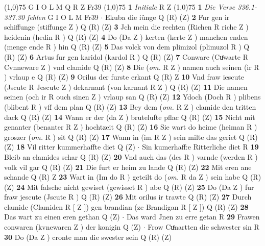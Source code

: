 \documentclass[8pt,a4paper,notitlepage]{article}
\begin{document}
\begin{table}[ht]
\begin{minipage}[t]{0.5\linewidth}
\line(1,0){75} \newline
G I O L M Q R Z Fr39 \newline
\line(1,0){75} \newline
\textbf{1} \textit{Initiale} R Z  \newline
\line(1,0){75} \newline
\textbf{1} \textit{Die Verse 336.1-337.30 fehlen} G I O L M Fr39   $\cdot$ Ekuba die iûnge Q (R) (Z) \textbf{2} Fur gen ir schiffunge (stiffunge Z ) Q (R) (Z) \textbf{3} Jch mein die rechten (Richen R riche Z ) heidenin (hedin R ) Q (R) (Z) \textbf{4} Do (Da Z ) kerten (kerte Z ) manchen enden (menge ende R ) hin Q (R) (Z) \textbf{5} Das volck von dem plimizol (plimuzol R ) Q (R) (Z) \textbf{6} Artus fur gen karidol (kardol R ) Q (R) (Z) \textbf{7} Conware (Cuͦwarte R Cvnneware Z ) vnd clamide Q (R) (Z) \textbf{8} Die (\textit{om.} R Z ) namen auch seinen (ir R ) vrlaup e Q (R) (Z) \textbf{9} Orilus der furste erkant Q (R) Z \textbf{10} Vnd fraw iescute (Jscute R Jescute Z ) dekarnant (von karnant R Z ) Q (R) (Z) \textbf{11} Die namen seinen (och ir R ouch sinen Z ) vrlaup san Q (R) (Z) \textbf{12} Ydoch (Doch R ) plibens (blibent R ) vff dem plan Q (R) (Z) \textbf{13} Bey dem (\textit{om.} R Z ) clamide den tritten dack Q (R) (Z) \textbf{14} Wann er der (da Z ) brutelufte pflac Q (R) (Z) \textbf{15} Nicht mit genanter (benanter R Z ) hochtzeit Q (R) (Z) \textbf{16} Sie wart do heime (heiman R ) groszer (\textit{om.} R ) sit Q (R) (Z) \textbf{17} Wann in (im R Z ) sein milte das geriet Q (R) (Z) \textbf{18} Vil ritter kummerhaffte diet Q (Z)  $\cdot$ Sin kumerhaff:e Ritterliche diet R \textbf{19} Bleib an clamides schar Q (R) (Z) \textbf{20} Vnd auch das (des R ) varnde (werden R ) volk vil gar Q (R) (Z) \textbf{21} Die furt er heim zu lande Q (R) (Z) \textbf{22} Mit eren ane schande Q (R) Z \textbf{23} Wart in (Im do R ) geteilt do (\textit{om.} R da Z ) sein habe Q (R) (Z) \textbf{24} Mit falsche nicht gewiset (gewisset R ) abe Q (R) (Z) \textbf{25} Do (Da Z ) fur fraw jescute (Jscute R ) Q (R) (Z) \textbf{26} Mit orilus ir trawte Q (R) (Z) \textbf{27} Durch clamide (Clamiden R [ Z ]) gen brandian (ze Brandigan R [ Z ]) Q (R) (Z) \textbf{28} Das wart zu einen eren gethan Q (Z)  $\cdot$ Das ward Jnen zu erre getan R \textbf{29} Frawen conwaren (kvnewaren Z ) der konigin Q (Z)  $\cdot$ Frow Cuͦnartten die schwester sin R \textbf{30} Do (Da Z ) cronte man die swester sein Q (R) (Z) \newline
\end{minipage}
\hspace{0.5cm}

\end{table}
\end{document}
